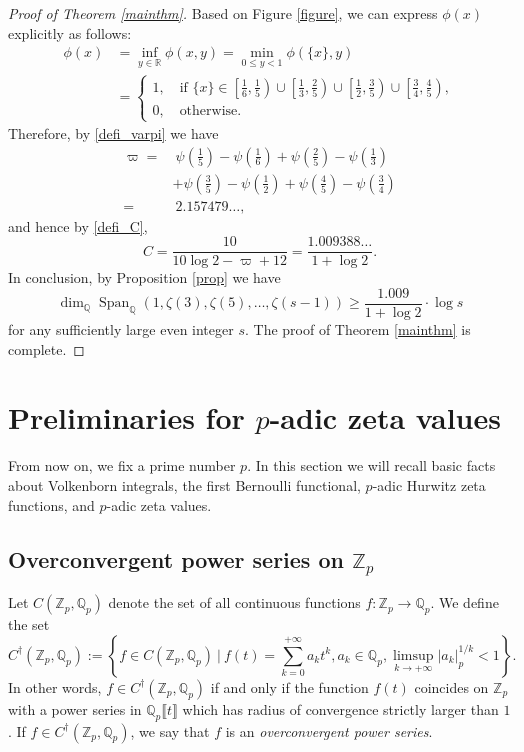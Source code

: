 \documentclass[12pt]{article}
\numberwithin{equation}{section}
\begin{document}
\begin{proof}[Proof of Theorem \ref{mainthm}]
Based on Figure \ref{figure}, we can express $\phi(x)$ explicitly as follows:
\begin{align*}
\phi(x) &= \inf_{y \in \mathbb{R}} \phi(x,y) =\min_{0 \leqslant y < 1} \phi(\{x\},y) \\
&= \begin{cases}
	1, \quad\text{if~} \{x\} \in \left[\frac{1}{6},\frac{1}{5}\right) \cup \left[\frac{1}{3},\frac{2}{5}\right) \cup \left[\frac{1}{2},\frac{3}{5}\right) \cup \left[\frac{3}{4},\frac{4}{5}\right), \\
	0, \quad\text{otherwise.} 
\end{cases}  
\end{align*} 
Therefore, by \eqref{defi_varpi} we have
\begin{align*}
\varpi =&~ \psi\left(\frac{1}{5}\right) - \psi\left(\frac{1}{6}\right) + \psi\left(\frac{2}{5}\right) - \psi\left(\frac{1}{3}\right) \\
&+ \psi\left(\frac{3}{5}\right) - \psi\left(\frac{1}{2}\right) + \psi\left(\frac{4}{5}\right) - \psi\left(\frac{3}{4}\right) \\
=&~ 2.157479\ldots,
\end{align*}
and hence by \eqref{defi_C},
\[ C = \frac{10}{10\log 2 - \varpi + 12} = \frac{1.009388\ldots}{1+\log 2}. \]
In conclusion, by Proposition \ref{prop} we have
\[  \dim_{\mathbb{Q}}\operatorname{Span}_{\mathbb{Q}}\left( 1,\zeta(3),\zeta(5),\ldots,\zeta(s-1) \right) \geqslant \frac{1.009}{1+\log 2} \cdot \log s
\]
for any sufficiently large even integer $s$. The proof of Theorem \ref{mainthm} is complete.
\end{proof}


\bigskip


\section{Preliminaries for $p$-adic zeta values}\label{Sect_Prel}

From now on, we fix a prime number $p$. In this section we will recall basic facts about Volkenborn integrals, the first Bernoulli functional, $p$-adic Hurwitz zeta functions, and $p$-adic zeta values.

\subsection{Overconvergent power series on $\mathbb{Z}_p$}
Let $C(\mathbb{Z}_p,\mathbb{Q}_p)$ denote the set of all continuous functions $f: \mathbb{Z}_p \longrightarrow \mathbb{Q}_p$. We define the set
\[ C^{\dagger}(\mathbb{Z}_p,\mathbb{Q}_p):= \left\{ f \in C(\mathbb{Z}_p,\mathbb{Q}_p) ~\Big|~ f(t) = \sum_{k=0}^{+\infty} a_k t^{k}, a_k \in \mathbb{Q}_p, \limsup_{k \to +\infty} |a_k|_p^{1/k} < 1    \right\}. \]
In other words, $f \in C^{\dagger}(\mathbb{Z}_p,\mathbb{Q}_p)$ if and only if the function $f(t)$ coincides on $\mathbb{Z}_p$ with a power series in $\mathbb{Q}_p\llbracket t \rrbracket$ which has radius of convergence strictly larger than $1$. If $f \in C^{\dagger}(\mathbb{Z}_p,\mathbb{Q}_p)$, we say that $f$ is an \emph{overconvergent power series}. 
\end{document}
